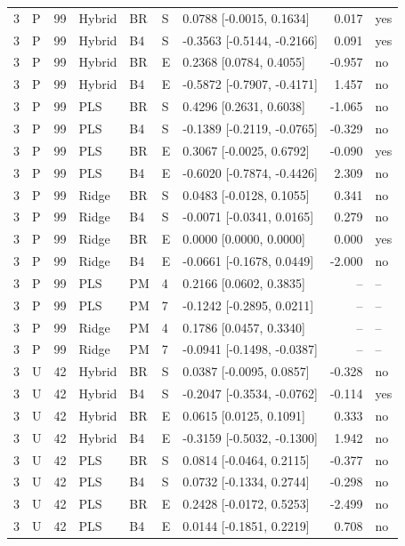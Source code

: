 \documentclass[10pt,a4paper]{article}
\begin{document}
\begin{longtable}{rlrllllrl}
3 & P & 99 & Hybrid & BR & S & 0.0788 [-0.0015, 0.1634] & 0.017 & yes \\
3 & P & 99 & Hybrid & B4 & S & -0.3563 [-0.5144, -0.2166] & 0.091 & yes \\
3 & P & 99 & Hybrid & BR & E & 0.2368 [0.0784, 0.4055] & -0.957 & no \\
3 & P & 99 & Hybrid & B4 & E & -0.5872 [-0.7907, -0.4171] & 1.457 & no \\
3 & P & 99 & PLS & BR & S & 0.4296 [0.2631, 0.6038] & -1.065 & no \\
3 & P & 99 & PLS & B4 & S & -0.1389 [-0.2119, -0.0765] & -0.329 & no \\
3 & P & 99 & PLS & BR & E & 0.3067 [-0.0025, 0.6792] & -0.090 & yes \\
3 & P & 99 & PLS & B4 & E & -0.6020 [-0.7874, -0.4426] & 2.309 & no \\
3 & P & 99 & Ridge & BR & S & 0.0483 [-0.0128, 0.1055] & 0.341 & no \\
3 & P & 99 & Ridge & B4 & S & -0.0071 [-0.0341, 0.0165] & 0.279 & no \\
3 & P & 99 & Ridge & BR & E & 0.0000 [0.0000, 0.0000] & 0.000 & yes \\
3 & P & 99 & Ridge & B4 & E & -0.0661 [-0.1678, 0.0449] & -2.000 & no \\
3 & P & 99 & PLS & PM & 4 & 0.2166 [0.0602, 0.3835] & -- & -- \\
3 & P & 99 & PLS & PM & 7 & -0.1242 [-0.2895, 0.0211] & -- & -- \\
3 & P & 99 & Ridge & PM & 4 & 0.1786 [0.0457, 0.3340] & -- & -- \\
3 & P & 99 & Ridge & PM & 7 & -0.0941 [-0.1498, -0.0387] & -- & -- \\
3 & U & 42 & Hybrid & BR & S & 0.0387 [-0.0095, 0.0857] & -0.328 & no \\
3 & U & 42 & Hybrid & B4 & S & -0.2047 [-0.3534, -0.0762] & -0.114 & yes \\
3 & U & 42 & Hybrid & BR & E & 0.0615 [0.0125, 0.1091] & 0.333 & no \\
3 & U & 42 & Hybrid & B4 & E & -0.3159 [-0.5032, -0.1300] & 1.942 & no \\
3 & U & 42 & PLS & BR & S & 0.0814 [-0.0464, 0.2115] & -0.377 & no \\
3 & U & 42 & PLS & B4 & S & 0.0732 [-0.1334, 0.2744] & -0.298 & no \\
3 & U & 42 & PLS & BR & E & 0.2428 [-0.0172, 0.5253] & -2.499 & no \\
3 & U & 42 & PLS & B4 & E & 0.0144 [-0.1851, 0.2219] & 0.708 & no \\

\end{longtable}
\end{document}
